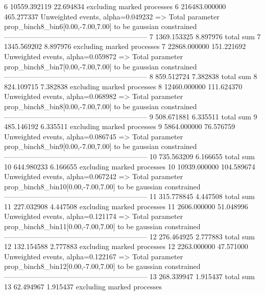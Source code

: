 6          10559.392119    22.694834       excluding marked processes    
6          216483.000000   465.277337      Unweighted events, alpha=0.049232
  => Total parameter prop_binch8_bin6[0.00,-7.00,7.00] to be gaussian constrained
------------------------------------------------------------
7          1369.153325     8.897976        total sum                     
7          1345.569202     8.897976        excluding marked processes    
7          22868.000000    151.221692      Unweighted events, alpha=0.059872
  => Total parameter prop_binch8_bin7[0.00,-7.00,7.00] to be gaussian constrained
------------------------------------------------------------
8          859.512724      7.382838        total sum                     
8          824.109715      7.382838        excluding marked processes    
8          12460.000000    111.624370      Unweighted events, alpha=0.068982
  => Total parameter prop_binch8_bin8[0.00,-7.00,7.00] to be gaussian constrained
------------------------------------------------------------
9          508.671881      6.335511        total sum                     
9          485.146192      6.335511        excluding marked processes    
9          5864.000000     76.576759       Unweighted events, alpha=0.086745
  => Total parameter prop_binch8_bin9[0.00,-7.00,7.00] to be gaussian constrained
------------------------------------------------------------
10         735.563209      6.166655        total sum                     
10         644.980233      6.166655        excluding marked processes    
10         10939.000000    104.589674      Unweighted events, alpha=0.067242
  => Total parameter prop_binch8_bin10[0.00,-7.00,7.00] to be gaussian constrained
------------------------------------------------------------
11         315.778845      4.447508        total sum                     
11         227.032908      4.447508        excluding marked processes    
11         2606.000000     51.048996       Unweighted events, alpha=0.121174
  => Total parameter prop_binch8_bin11[0.00,-7.00,7.00] to be gaussian constrained
------------------------------------------------------------
12         276.464925      2.777883        total sum                     
12         132.154588      2.777883        excluding marked processes    
12         2263.000000     47.571000       Unweighted events, alpha=0.122167
  => Total parameter prop_binch8_bin12[0.00,-7.00,7.00] to be gaussian constrained
------------------------------------------------------------
13         268.339947      1.915437        total sum                     
13         62.494967       1.915437        excluding marked processes    
